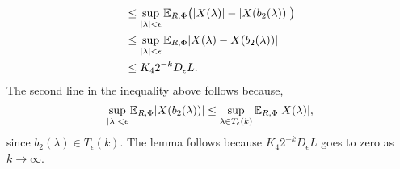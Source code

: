 \documentclass[journal]{IEEEtran}
\begin{document}
\begin{IEEEproof}
\begin{align*}
&\leq \sup_{{\vert \lambda \vert} < \epsilon} {\mathbb E}_{R,\Phi} \big( {\vert X(\lambda) \vert} - {\vert X(b_2(\lambda)) \vert} \big) \nonumber \\
&\leq \sup_{{\vert \lambda \vert} < \epsilon} {\mathbb E}_{R,\Phi} {\vert X(\lambda) - X(b_2(\lambda)) \vert} \nonumber \\
&\leq K_4 2^{-k} D_\epsilon L. \label{eq:Deps2nktozero}
\end{align*}
The second line in the inequality above follows because,
\[
\sup_{{\vert \lambda \vert} < \epsilon} {\mathbb E}_{R,\Phi} {\vert X(b_2(\lambda)) \vert} \leq \sup_{\lambda \in T_\epsilon(k)} {\mathbb E}_{R,\Phi} {\vert X(\lambda) \vert},
\]
since $b_2(\lambda) \in T_\epsilon(k)$.  The lemma follows because $K_4 2^{-k} D_\epsilon L$ goes to zero as $k\rightarrow\infty$.
\end{IEEEproof}




\end{document}
